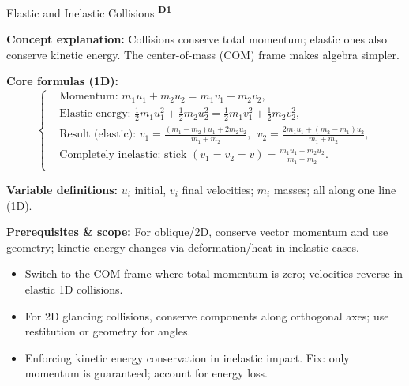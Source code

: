 ﻿\documentclass[12pt,a4paper]{article}
\providecommand{\KPFormulas}{}
\providecommand{\KPHeuristics}{}
\newcommand{\DOne}{\texorpdfstring{\textsuperscript{\textbf{D1}}}{ D1}}
\begin{document}
\begin{KnowledgePoint}{Elastic and Inelastic Collisions \DOne}
  \KPFormulas
  \begin{formulabox}
  \textbf{Concept explanation:} Collisions conserve total momentum; elastic ones also conserve kinetic energy. The center-of-mass (COM) frame makes algebra simpler.

  \textbf{Core formulas (1D):}
  \[
  \left\{\begin{aligned}
    &\text{Momentum: } m_1u_1+m_2u_2=m_1v_1+m_2v_2,\\
    &\text{Elastic energy: } \tfrac12 m_1u_1^2+\tfrac12 m_2u_2^2=\tfrac12 m_1v_1^2+\tfrac12 m_2v_2^2,\\
    &\text{Result (elastic): } v_1=\frac{(m_1-m_2)u_1+2m_2u_2}{m_1+m_2},\ \ v_2=\frac{2m_1u_1+(m_2-m_1)u_2}{m_1+m_2},\\
    &\text{Completely inelastic: stick }(v_1=v_2=v)=\frac{m_1u_1+m_2u_2}{m_1+m_2}.\\
  \end{aligned}\right.
  \]

  \textbf{Variable definitions:} $u_i$ initial, $v_i$ final velocities; $m_i$ masses; all along one line (1D).

  

  \textbf{Prerequisites \& scope:} For oblique/2D, conserve vector momentum and use geometry; kinetic energy changes via deformation/heat in inelastic cases.
  \end{formulabox}

  \KPHeuristics
  \begin{heuristicsbox}
  \begin{itemize}[leftmargin=*]
    \item Switch to the COM frame where total momentum is zero; velocities reverse in elastic 1D collisions.
    \item For 2D glancing collisions, conserve components along orthogonal axes; use restitution or geometry for angles.
  \end{itemize}
  \vspace{0.4em}
  \begin{itemize}[leftmargin=*]
    \item Enforcing kinetic energy conservation in inelastic impact. Fix: only momentum is guaranteed; account for energy loss.
  \end{itemize}
  \end{heuristicsbox}


\end{KnowledgePoint}
\end{document}
